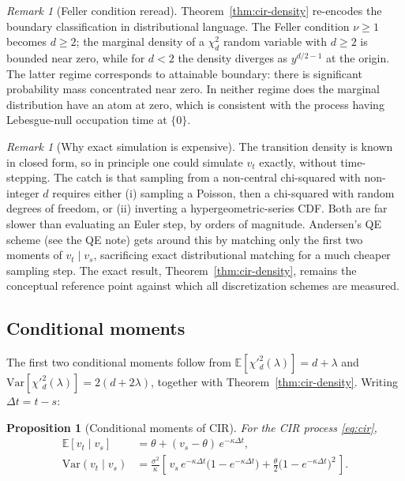 \documentclass[11pt]{article}
\theoremstyle{plain}
\newtheorem{proposition}[theorem]{Proposition}
\theoremstyle{definition}
\theoremstyle{remark}
\newtheorem{remark}[theorem]{Remark}
\begin{document}
\begin{remark}[Feller condition reread]
    Theorem~\ref{thm:cir-density} re-encodes the boundary classification in distributional language. The Feller condition \(\nu \geq 1\) becomes \(d \geq 2\); the marginal density of a \(\chi^2_d\) random variable with \(d \geq 2\) is bounded near zero, while for \(d < 2\) the density diverges as \(y^{d/2 - 1}\) at the origin. The latter regime corresponds to attainable boundary: there is significant probability mass concentrated near zero. In neither regime does the marginal distribution have an atom at zero, which is consistent with the process having Lebesgue-null occupation time at \(\{0\}\).
\end{remark}

\begin{remark}[Why exact simulation is expensive]
    The transition density is known in closed form, so in principle one could simulate \(v_t\) exactly, without time-stepping. The catch is that sampling from a non-central chi-squared with non-integer \(d\) requires either (i) sampling a Poisson, then a chi-squared with random degrees of freedom, or (ii) inverting a hypergeometric-series CDF. Both are far slower than evaluating an Euler step, by orders of magnitude. Andersen's QE scheme \cite{Andersen2008} (see the QE note) gets around this by matching only the first two moments of \(v_t \mid v_s\), sacrificing exact distributional matching for a much cheaper sampling step. The exact result, Theorem~\ref{thm:cir-density}, remains the conceptual reference point against which all discretization schemes are measured.
\end{remark}

\subsection{Conditional moments}

The first two conditional moments follow from \(\mathbb{E}[\chi'^2_d(\lambda)] = d + \lambda\) and \(\mathrm{Var}[\chi'^2_d(\lambda)] = 2(d + 2\lambda)\), together with Theorem~\ref{thm:cir-density}. Writing \(\Delta t = t - s\):

\begin{proposition}[Conditional moments of CIR]\label{prop:cir-moments}
    For the CIR process \eqref{eq:cir},
    \begin{align}
        \mathbb{E}[v_t \mid v_s]   &= \theta + (v_s - \theta)\,e^{-\kappa\Delta t},                                                        \label{eq:cir-mean}\\
        \mathrm{Var}(v_t \mid v_s) &= \frac{\sigma^2}{\kappa}\!\left[\,v_s\,e^{-\kappa\Delta t}\bigl(1 - e^{-\kappa\Delta t}\bigr) + \frac{\theta}{2}\bigl(1 - e^{-\kappa\Delta t}\bigr)^2\,\right].   \label{eq:cir-var}
    \end{align}
\end{proposition}
\end{document}
